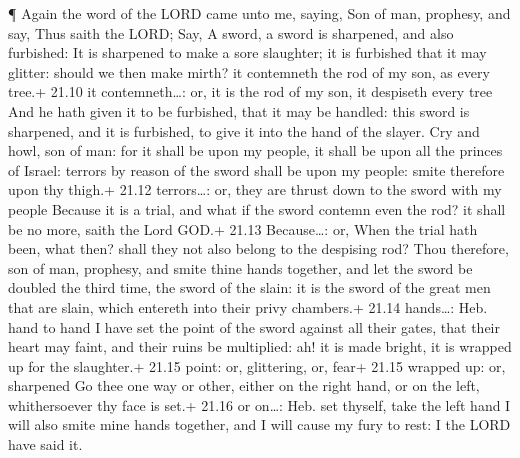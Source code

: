  ¶ Again the word of the LORD came unto me, saying,
 Son of man, prophesy, and say, Thus saith the LORD; Say, A
sword, a sword is sharpened, and also furbished:  It is
sharpened to make a sore slaughter; it is furbished that it may glitter:
should we then make mirth? it contemneth the rod of my son, as every
tree.+ 21.10 it contemneth\ldots: or, it is the rod of my son, it
despiseth every tree  And he hath given it to be furbished,
that it may be handled: this sword is sharpened, and it is furbished, to
give it into the hand of the slayer.  Cry and howl, son of
man: for it shall be upon my people, it shall be upon all the princes of
Israel: terrors by reason of the sword shall be upon my people: smite
therefore upon thy thigh.+ 21.12 terrors\ldots: or, they are thrust down
to the sword with my people  Because it is a trial, and
what if the sword contemn even the rod? it shall be no more, saith the
Lord GOD.+ 21.13 Because\ldots: or, When the trial hath been, what then?
shall they not also belong to the despising rod?  Thou
therefore, son of man, prophesy, and smite thine hands together, and let
the sword be doubled the third time, the sword of the slain: it is the
sword of the great men that are slain, which entereth into their privy
chambers.+ 21.14 hands\ldots: Heb. hand to hand  I have set
the point of the sword against all their gates, that their heart may
faint, and their ruins be multiplied: ah! it is made bright, it is
wrapped up for the slaughter.+ 21.15 point: or, glittering, or, fear+
21.15 wrapped up: or, sharpened  Go thee one way or other,
either on the right hand, or on the left, whithersoever thy face is
set.+ 21.16 or on\ldots: Heb. set thyself, take the left hand
 I will also smite mine hands together, and I will cause my
fury to rest: I the LORD have said it.

